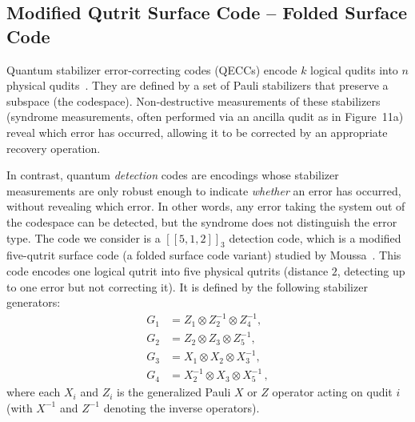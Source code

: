 \subsection{Modified Qutrit Surface Code -- Folded Surface Code}
Quantum stabilizer error-correcting codes (QECCs) encode $k$ logical qudits into $n$ physical qudits~\cite{Ref32}. They are defined by a set of Pauli stabilizers that preserve a subspace (the codespace). Non-destructive measurements of these stabilizers (syndrome measurements, often performed via an ancilla qudit as in Figure~11a) reveal which error has occurred, allowing it to be corrected by an appropriate recovery operation.

In contrast, quantum \emph{detection} codes are encodings whose stabilizer measurements are only robust enough to indicate \emph{whether} an error has occurred, without revealing which error. In other words, any error taking the system out of the codespace can be detected, but the syndrome does not distinguish the error type. The code we consider is a $[[5,1,2]]_3$ detection code, which is a modified five-qutrit surface code (a folded surface code variant) studied by Moussa~\cite{Moussa}. This code encodes one logical qutrit into five physical qutrits (distance $2$, detecting up to one error but not correcting it). It is defined by the following stabilizer generators:
\begin{equation}
    \begin{aligned}
        G_1 &= Z_1 \otimes Z_2^{-1} \otimes Z_4^{-1},\\
        G_2 &= Z_2 \otimes Z_3 \otimes Z_5^{-1},\\
        G_3 &= X_1 \otimes X_2 \otimes X_3^{-1},\\
        G_4 &= X_2^{-1} \otimes X_3 \otimes X_5^{-1}\,,
    \end{aligned}
\end{equation}
where each $X_i$ and $Z_i$ is the generalized Pauli $X$ or $Z$ operator acting on qudit $i$ (with $X^{-1}$ and $Z^{-1}$ denoting the inverse operators).


